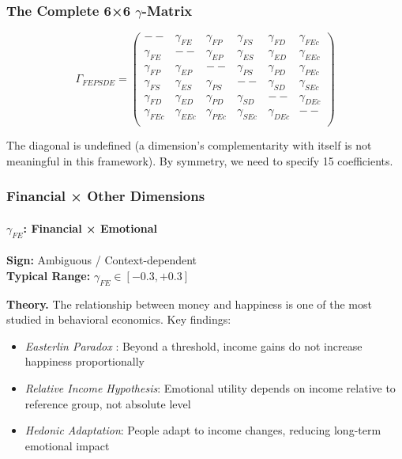 \subsubsection{The Complete 6×6 $\gamma$-Matrix}

\begin{equation}
\Gamma_{FEPSDE} = \begin{pmatrix}
-- & \gamma_{FE} & \gamma_{FP} & \gamma_{FS} & \gamma_{FD} & \gamma_{FEc} \\
\gamma_{FE} & -- & \gamma_{EP} & \gamma_{ES} & \gamma_{ED} & \gamma_{EEc} \\
\gamma_{FP} & \gamma_{EP} & -- & \gamma_{PS} & \gamma_{PD} & \gamma_{PEc} \\
\gamma_{FS} & \gamma_{ES} & \gamma_{PS} & -- & \gamma_{SD} & \gamma_{SEc} \\
\gamma_{FD} & \gamma_{ED} & \gamma_{PD} & \gamma_{SD} & -- & \gamma_{DEc} \\
\gamma_{FEc} & \gamma_{EEc} & \gamma_{PEc} & \gamma_{SEc} & \gamma_{DEc} & -- \\
\end{pmatrix}
\label{eq:gamma-fepsde-matrix}
\end{equation}

The diagonal is undefined (a dimension's complementarity with itself is not 
meaningful in this framework). By symmetry, we need to specify 15 coefficients.


\subsubsection{Financial × Other Dimensions}

\paragraph{$\gamma_{FE}$: Financial × Emotional}

\begin{tcolorbox}[colback=yellow!5, colframe=yellow!50!black]
\textbf{Sign:} Ambiguous / Context-dependent \\
\textbf{Typical Range:} $\gamma_{FE} \in [-0.3, +0.3]$
\end{tcolorbox}

\textbf{Theory.}
The relationship between money and happiness is one of the most studied in 
behavioral economics. Key findings:
\begin{itemize}
    \item \textit{Easterlin Paradox} \citep{easterlin1974}: Beyond a threshold, 
          income gains do not increase happiness proportionally
    \item \textit{Relative Income Hypothesis}: Emotional utility depends on 
          income relative to reference group, not absolute level
    \item \textit{Hedonic Adaptation}: People adapt to income changes, 
          reducing long-term emotional impact
\end{itemize}

